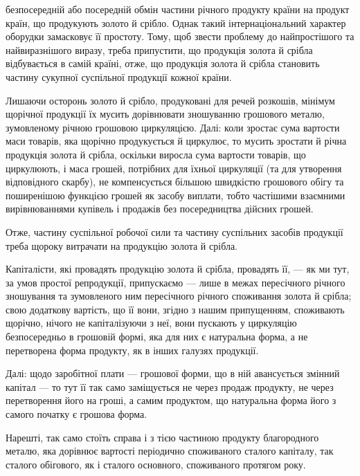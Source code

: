 \parcont{}  %
безпосередній або посередній обмін частини річного продукту країни на
продукт країн, що продукують золото й срібло. Однак такий інтернаціональний
характер оборудки замасковує її простоту. Тому, щоб звести
проблему до найпростішого та найвиразнішого виразу, треба припустити,
що продукція золота й срібла відбувається в самій країні, отже, що продукція
золота й срібла становить частину сукупної суспільної продукції
кожної країни.

Лишаючи осторонь золото й срібло, продуковані для речей розкошів,
мінімум щорічної продукції їх мусить дорівнювати зношуванню грошового
металю, зумовленому річною грошовою циркуляцією. Далі: коли
зростає сума вартости маси товарів, яка щорічно продукується й циркулює,
то мусить зростати й річна продукція золота й срібла, оскільки
виросла сума вартости товарів, що циркулюють, і маса грошей, потрібних
для їхньої циркуляції (та для утворення відповідного скарбу), не компенсується
більшою швидкістю грошового обігу та поширенішою функцією
грошей як засобу виплати, тобто частішими взаємними вирівнюваннями
купівель і продажів без посередництва дійсних грошей.

Отже, частину суспільної робочої сили та частину суспільних засобів
продукції треба щороку витрачати на продукцію золота й срібла.

Капіталісти, які провадять продукцію золота й срібла, провадять її, —
як ми тут, за умов простої репродукції, припускаємо — лише в межах
пересічного річного зношування та зумовленого ним пересічного річного
споживання золота й срібла; свою додаткову вартість, що її вони, згідно
з нашим припущенням, споживають щорічно, нічого не капіталізуючи з
неї, вони пускають у циркуляцію безпосередньо в грошовій формі, яка
для них є натуральна форма, а не перетворена форма продукту, як в інших
галузях продукції.

Далі: щодо заробітної плати — грошової форми, що в ній авансується
змінний капітал — то тут її так само заміщується не через продаж
продукту, не через перетворення його на гроші, а самим продуктом, що
натуральна форма його з самого початку є грошова форма.

Нарешті, так само стоїть справа і з тією частиною продукту благородного
металю, яка дорівнює вартості періодично споживаного сталого
капіталу, так сталого обігового, як і сталого основного, споживаного протягом
року.

